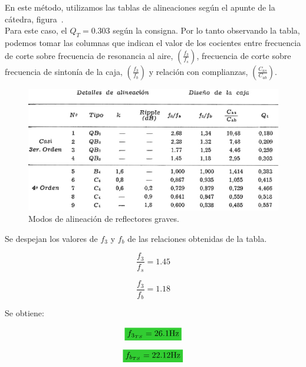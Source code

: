 
\normalfont

En este método, utilizamos las tablas de alineaciones según el apunte de la cátedra, figura~. \\
Para este caso, el $Q_{T} = 0.303$ según la consigna. Por lo tanto observando la tabla, podemos tomar las columnas que indican el valor de los cocientes entre frecuencia de corte sobre frecuencia de resonancia al aire, $\left( \frac{f_{3}}{f_{s}} \right)$, frecuencia de corte sobre frecuencia de sintonía de la caja, $\left( \frac{f_{3}}{f_{b}} \right)$ y relación con complianzas, $\left( \frac{C_{as}}{C_{ab}} \right)$. \\


\begin{figure}[H]
	\centering
	\includegraphics[width=1\textwidth]{./img/diag/align_modes.png}
	\caption{Modos de alineación de reflectores graves.}
	\label{fig:align_modes_table}
\end{figure}


Se despejan los valores de $f_{3}$ y $f_{b}$ de las relaciones obtenidas de la tabla.


\begin{equation}
\frac{f_{3}}{f_{s}} = 1.45
\end{equation}


\begin{equation}
\frac{f_{3}}{f_{b}} = 1.18
\end{equation}

Se obtiene:

\begin{equation*}
\mathcolorbox{EQColor}{ f_{3_{TS}} = 26.1 \si[per-mode=symbol]{\hertz} }
\end{equation*}


\begin{equation*}
\mathcolorbox{EQColor}{ f_{b_{TS}} = 22.12 \si[per-mode=symbol]{\hertz} }
\end{equation*}



